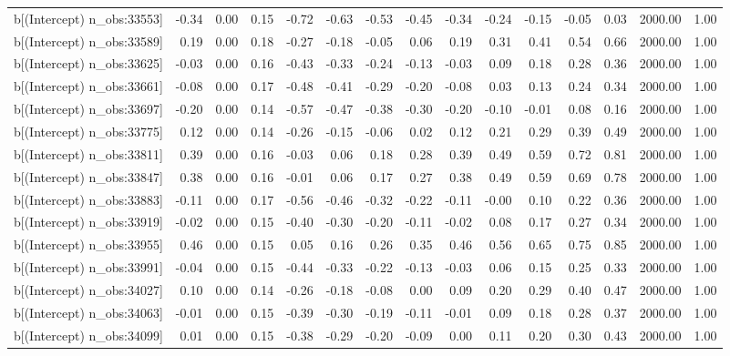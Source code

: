 \begin{table}[ht]
\begin{tabular}{rrrrrrrrrrrrrrr}
  b[(Intercept) n\_obs:33553] & -0.34 & 0.00 & 0.15 & -0.72 & -0.63 & -0.53 & -0.45 & -0.34 & -0.24 & -0.15 & -0.05 & 0.03 & 2000.00 & 1.00 \\ 
  b[(Intercept) n\_obs:33589] & 0.19 & 0.00 & 0.18 & -0.27 & -0.18 & -0.05 & 0.06 & 0.19 & 0.31 & 0.41 & 0.54 & 0.66 & 2000.00 & 1.00 \\ 
  b[(Intercept) n\_obs:33625] & -0.03 & 0.00 & 0.16 & -0.43 & -0.33 & -0.24 & -0.13 & -0.03 & 0.09 & 0.18 & 0.28 & 0.36 & 2000.00 & 1.00 \\ 
  b[(Intercept) n\_obs:33661] & -0.08 & 0.00 & 0.17 & -0.48 & -0.41 & -0.29 & -0.20 & -0.08 & 0.03 & 0.13 & 0.24 & 0.34 & 2000.00 & 1.00 \\ 
  b[(Intercept) n\_obs:33697] & -0.20 & 0.00 & 0.14 & -0.57 & -0.47 & -0.38 & -0.30 & -0.20 & -0.10 & -0.01 & 0.08 & 0.16 & 2000.00 & 1.00 \\ 
  b[(Intercept) n\_obs:33775] & 0.12 & 0.00 & 0.14 & -0.26 & -0.15 & -0.06 & 0.02 & 0.12 & 0.21 & 0.29 & 0.39 & 0.49 & 2000.00 & 1.00 \\ 
  b[(Intercept) n\_obs:33811] & 0.39 & 0.00 & 0.16 & -0.03 & 0.06 & 0.18 & 0.28 & 0.39 & 0.49 & 0.59 & 0.72 & 0.81 & 2000.00 & 1.00 \\ 
  b[(Intercept) n\_obs:33847] & 0.38 & 0.00 & 0.16 & -0.01 & 0.06 & 0.17 & 0.27 & 0.38 & 0.49 & 0.59 & 0.69 & 0.78 & 2000.00 & 1.00 \\ 
  b[(Intercept) n\_obs:33883] & -0.11 & 0.00 & 0.17 & -0.56 & -0.46 & -0.32 & -0.22 & -0.11 & -0.00 & 0.10 & 0.22 & 0.36 & 2000.00 & 1.00 \\ 
  b[(Intercept) n\_obs:33919] & -0.02 & 0.00 & 0.15 & -0.40 & -0.30 & -0.20 & -0.11 & -0.02 & 0.08 & 0.17 & 0.27 & 0.34 & 2000.00 & 1.00 \\ 
  b[(Intercept) n\_obs:33955] & 0.46 & 0.00 & 0.15 & 0.05 & 0.16 & 0.26 & 0.35 & 0.46 & 0.56 & 0.65 & 0.75 & 0.85 & 2000.00 & 1.00 \\ 
  b[(Intercept) n\_obs:33991] & -0.04 & 0.00 & 0.15 & -0.44 & -0.33 & -0.22 & -0.13 & -0.03 & 0.06 & 0.15 & 0.25 & 0.33 & 2000.00 & 1.00 \\ 
  b[(Intercept) n\_obs:34027] & 0.10 & 0.00 & 0.14 & -0.26 & -0.18 & -0.08 & 0.00 & 0.09 & 0.20 & 0.29 & 0.40 & 0.47 & 2000.00 & 1.00 \\ 
  b[(Intercept) n\_obs:34063] & -0.01 & 0.00 & 0.15 & -0.39 & -0.30 & -0.19 & -0.11 & -0.01 & 0.09 & 0.18 & 0.28 & 0.37 & 2000.00 & 1.00 \\ 
  b[(Intercept) n\_obs:34099] & 0.01 & 0.00 & 0.15 & -0.38 & -0.29 & -0.20 & -0.09 & 0.00 & 0.11 & 0.20 & 0.30 & 0.43 & 2000.00 & 1.00 \\ 

\end{tabular}
\end{table}
